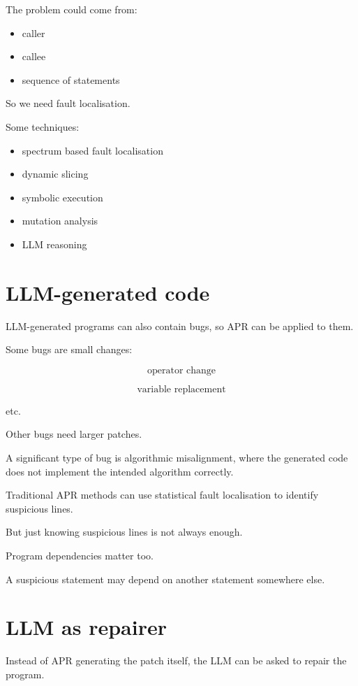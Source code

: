 \documentclass[11pt]{book}
\begin{document}
The problem could come from:

\begin{itemize}
    \item caller
    \item callee
    \item sequence of statements
\end{itemize}

So we need fault localisation.

Some techniques:

\begin{itemize}
    \item spectrum based fault localisation
    \item dynamic slicing
    \item symbolic execution
    \item mutation analysis
    \item LLM reasoning
\end{itemize}

\section{LLM-generated code}

LLM-generated programs can also contain bugs,
so APR can be applied to them.

Some bugs are small changes:

\[
\text{operator change}
\]

\[
\text{variable replacement}
\]

etc.

Other bugs need larger patches.

A significant type of bug is algorithmic misalignment,
where the generated code does not implement the
intended algorithm correctly.

Traditional APR methods can use statistical fault
localisation to identify suspicious lines.

But just knowing suspicious lines is not always enough.

Program dependencies matter too.

A suspicious statement may depend on another statement
somewhere else.

\section{LLM as repairer}

Instead of APR generating the patch itself,
the LLM can be asked to repair the program.
\end{document}
